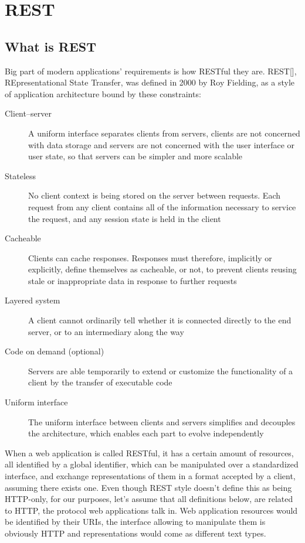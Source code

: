 \chapter{REST}

\section{What is REST}

Big part of modern applications' requirements is how RESTful they are. REST[], REpresentational State Transfer, was defined in 2000 by Roy Fielding, as a style of application architecture bound by these constraints:

\begin{description}
  \item[Client–server] A uniform interface separates clients from servers, clients are not concerned with data storage and servers are not concerned with the user interface or user state, so that servers can be simpler and more scalable
  \item[Stateless] No client context is being stored on the server between requests. Each request from any client contains all of the information necessary to service the request, and any session state is held in the client
  \item[Cacheable] Clients can cache responses. Responses must therefore, implicitly or explicitly, define themselves as cacheable, or not, to prevent clients reusing stale or inappropriate data in response to further requests
  \item[Layered system] A client cannot ordinarily tell whether it is connected directly to the end server, or to an intermediary along the way
  \item[Code on demand (optional)] Servers are able temporarily to extend or customize the functionality of a client by the transfer of executable code
  \item[Uniform interface] The uniform interface between clients and servers simplifies and decouples the architecture, which enables each part to evolve independently
\end{description}

When a web application is called RESTful, it has a certain amount of resources, all identified by a global identifier, which can be manipulated over a standardized interface, and exchange representations of them in a format accepted by a client, assuming there exists one. Even though REST style doesn't define this as being HTTP-only, for our purposes, let's assume that all definitions below, are related to HTTP, the protocol web applications talk in. Web application resources would be identified by their URIs, the interface allowing to manipulate them is obviously HTTP and representations would come as different text types.

